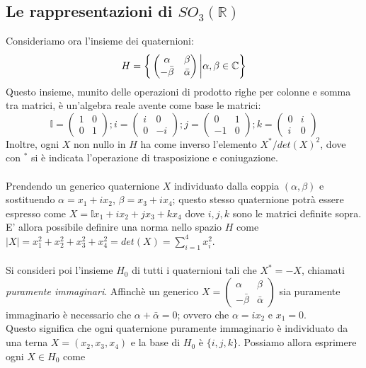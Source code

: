 \documentclass[12pt,a4paper]{report}
\theoremstyle{definition}
\theoremstyle{definition}
\theoremstyle{definition}
\theoremstyle{definition}
\begin{document}
\subsection{Le rappresentazioni di $SO_3(\mathbb{R})$}
Consideriamo ora l'insieme dei quaternioni:
$$H=\bigg{\{}
\begin{pmatrix}
	\alpha & \beta \\
	-\bar{\beta} & \bar{\alpha}
\end{pmatrix}
\bigg{\rvert}\alpha,\beta\in \mathbb{C}
\bigg{\}}$$
Questo insieme, munito delle operazioni di prodotto righe per colonne e somma tra matrici, è un'algebra reale avente come base le matrici:
$$\mathbb{I}=\begin{pmatrix}
	1 & 0 \\
	0 & 1
\end{pmatrix};
i=\begin{pmatrix}
	i & 0 \\
	0 & -i
\end{pmatrix};
j=\begin{pmatrix}
	0 & 1 \\
	-1 & 0
\end{pmatrix};
k=\begin{pmatrix}
	0 & i \\
	i & 0
\end{pmatrix}$$
Inoltre, ogni $X$ non nullo in $H$ ha come inverso l'elemento $X^*/det(X)^2$, dove con $^*$ si è indicata l'operazione di trasposizione e coniugazione.\\
\\
Prendendo un generico quaternione $X$ individuato dalla coppia $(\alpha,\beta)$ e sostituendo $\alpha=x_1+ix_2$, $\beta=x_3+ix_4$; questo stesso quaternione potrà essere espresso come $X=\mathbb{I}x_1+ix_2+jx_3+kx_4$ dove $i,j,k$ sono le matrici definite sopra. E' allora possibile definire una norma nello spazio $H$ come $|X|=x_1^2+x_2^2+x_3^2+x_4^2=det(X)=\sum_{i=1}^{4}x_i^2$.\\
\\
Si consideri poi l'insieme $H_0$ di tutti i quaternioni tali che $X^*=-X$, chiamati \textit{puramente immaginari}. Affinchè un generico $X=\begin{pmatrix}
	\alpha & \beta \\
	-\bar{\beta} & \bar{\alpha}
\end{pmatrix}$ sia puramente immaginario è necessario che $\alpha+\bar{\alpha}=0$; ovvero che $\alpha=ix_2$ e $x_1=0$.\\
Questo significa che ogni quaternione puramente immaginario è individuato da una terna $X=(x_2,x_3,x_4)$ e la base di $H_0$ è $\{i,j,k\}$. Possiamo allora esprimere ogni $X\in H_0$ come
\end{document}
